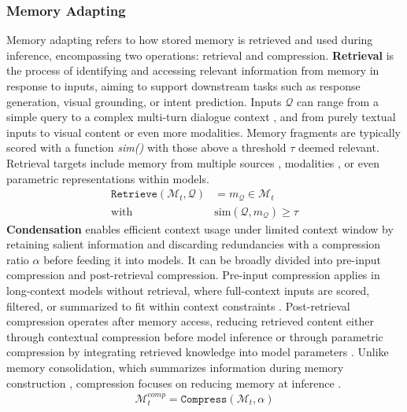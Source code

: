 \documentclass[manuscript,screen]{acmart}
\begin{document}
\subsubsection{Memory Adapting}
Memory adapting refers to how stored memory is retrieved and used during inference, encompassing two operations: retrieval and compression. \newline \textbf{Retrieval} is the process of identifying and accessing relevant information from memory in response to inputs, aiming to support downstream tasks such as response generation, visual grounding, or intent prediction.
Inputs $\mathcal{Q}$ can range from a simple query \citep{du2024perltqa} to a complex multi-turn dialogue context \citep{wang2025new}, and from purely textual inputs to visual content \citep{zhou2024vista} or even more modalities. Memory fragments are typically scored with a function \textit{sim()} with those above a threshold $\tau$ deemed relevant. Retrieval targets include memory from multiple sources \citep{tan-etal-2024-blinded}, modalities \citep{wang2025new}, or even parametric representations \citep{luo-etal-2024-landmark} within models. 
\begin{equation}
\begin{split}
    \texttt{Retrieve}(\mathcal{M}_{t}, \mathcal{Q}) &= m_{\mathcal{Q}} \in \mathcal{M}_{t} \\ \text{with } &\text{sim}(\mathcal{Q}, m_{\mathcal{Q}}) \geq \tau
\end{split}
\end{equation}
\newline \textbf{Condensation} enables efficient context usage under limited context window by retaining salient information and discarding redundancies with a compression ratio $\alpha$ before feeding it into models. It can be broadly divided into pre-input compression and post-retrieval compression. Pre-input compression applies in long-context models without retrieval, where full-context inputs are scored, filtered, or summarized to fit within context constraints \citep{yu-etal-2023-trams, chung-etal-2024-selection}. Post-retrieval compression operates after memory access, reducing retrieved content either through contextual compression before model inference \citep{xu2024recomp} or through parametric compression by integrating retrieved knowledge into model parameters \citep{safaya-yuret-2024-neurocache}. Unlike memory consolidation, which summarizes information during memory construction \citep{zhong2024memorybank}, compression focuses on reducing memory at inference \citep{pmlr-v235-lee24c}.
\begin{equation}
\begin{split}
    \mathcal{M}_{t}^{comp}=\texttt{Compress}(\mathcal{M}_{t}, \alpha)
\end{split}
\end{equation}
\end{document}
